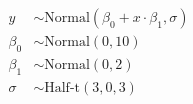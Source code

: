 \documentclass[10pt]{article}
\begin{document}
\begin{align*}y &\sim \mathrm{Normal}(\beta_0 + x \cdot \beta_1, \sigma)\\
\beta_0 &\sim \mathrm{Normal}(0, 10)\\
\beta_1 &\sim \mathrm{Normal}(0, 2)\\
\sigma &\sim \text{Half-t}(3, 0, 3)\end{align*}
\end{document}
